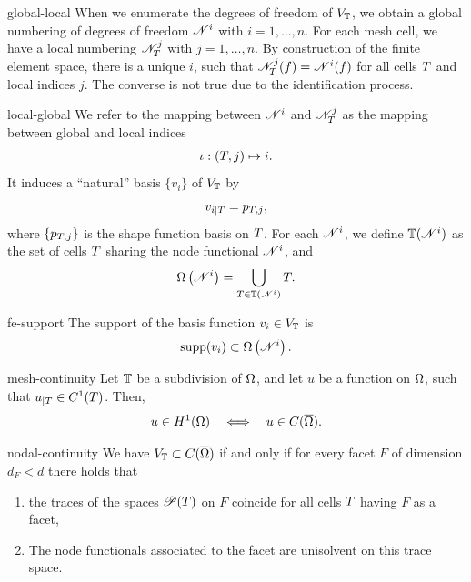 \begin{Notation}{global-local}
  When we enumerate the degrees of freedom of $V_\mathbb T$, we obtain a
  global numbering of degrees of freedom $\mathscr N^i$ with
  $i=1,\dots,n$. For each mesh cell, we have a local numbering
  $\mathscr N_T^j$ with $j=1,\dots,n$. By construction of the finite
  element space, there is a unique $i$, such that
  $\mathscr N_T^j(f) = \mathscr N^i(f)$ for all cells $T$ and local
  indices $j$. The converse is not true due to the identification
  process.
\end{Notation}

\begin{Definition}{local-global}
  We refer to the mapping between $\mathscr N^i$ and $\mathscr N_T^j$ as
  the mapping between global and local indices
  \begin{gather}
    \iota: (T, j) \mapsto i.
  \end{gather}
  It induces a
  ``natural'' basis $\{v_i\}$ of $V_\mathbb T$ by
  \begin{gather}
    v_{i|T} = p_{T,j},
  \end{gather}
  where $\{p_{T,j}\}$ is the shape function basis on $T$. For
  each $\mathscr N^i$, we define $\mathbb T(\mathscr N^i)$ as the set of cells
  $T$ sharing the node functional $\mathscr N^i$, and
  \begin{gather}
    \Omega\left(\mathscr N^i\right) = \bigcup_{T\in \mathbb T(\mathscr N^i)} T.
  \end{gather}
\end{Definition}

\begin{Lemma}{fe-support}
  The support of the basis function $v_i\in V_\mathbb T$ is
  \begin{gather*}
    \operatorname{supp}(v_i) \subset \Omega\left(\mathscr N^i\right).
  \end{gather*}
\end{Lemma}

\begin{Lemma}{mesh-continuity}
  Let $\mathbb T$ be a subdivision of $\Omega$, and let $u$ be a function
  on $\Omega$, such that $u_{|T} \in C^1(T)$. Then,
  \begin{gather}
    u\in H^1(\Omega)
    \quad \Longleftrightarrow\quad
    u\in C(\overline{\Omega}).
  \end{gather}
\end{Lemma}

\begin{Lemma}{nodal-continuity}
  We have $V_\mathbb T\subset C(\overline{\Omega})$ if and only if for
  every facet $F$ of dimension $d_F < d$ there holds that
  \begin{enumerate}
  \item the traces of the spaces $\mathscr P(T)$ on $F$ coincide
    for all cells $T$ having $F$ as a facet,
  \item The node functionals associated to the facet are unisolvent on
    this trace space.
  \end{enumerate}
\end{Lemma}

